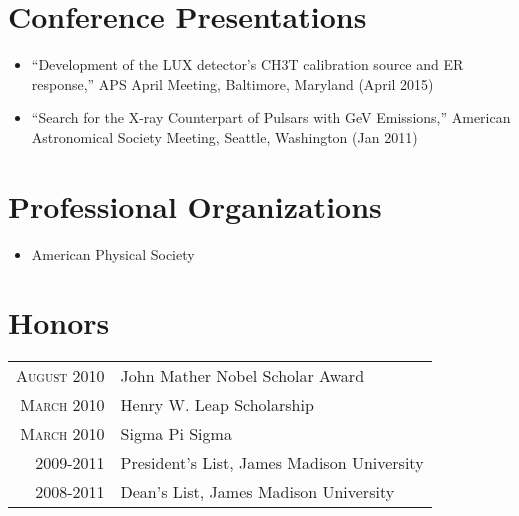 \documentclass[a4paper,10pt]{article}
\begin{document}
  
  
\section{Conference Presentations}
\begin{itemize}

\item ``Development of the LUX detector's CH3T calibration source and ER response,'' APS April Meeting, Baltimore, Maryland (April 2015)

\item ``Search for the X-ray Counterpart of Pulsars with GeV Emissions,'' American \newline Astronomical Society Meeting, Seattle, Washington (Jan 2011)

\end{itemize}

\section{Professional Organizations}
\begin{itemize}

\item American Physical Society

\end{itemize}


\section{Honors}
\begin{tabular}{rl}
 \textsc{August} 2010 & John Mather Nobel Scholar Award \\
\textsc{March} 2010 & Henry W. Leap Scholarship \\
\textsc{March} 2010 & Sigma Pi Sigma \\
2009-2011 & President's List, James Madison University \\
2008-2011 & Dean's List, James Madison University \\
\end{tabular}



\end{document}

